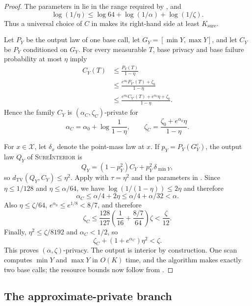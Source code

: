 \documentclass[11pt]{article}
\begin{document}
\begin{proof}
The parameters in  lie in the range required by
, and
\[
 \log(1/\eta)
 \le\log64+\log(1/\alpha)+\log(1/\zeta).
\]
Thus a universal choice of $C$ in  makes its
right-hand side at least $K_{\mathrm{sure}}$.

Let $P_Y$ be the output law of one base call, let
$G_Y=[\min Y,\max Y]$, and let $C_Y$ be $P_Y$ conditioned on $G_Y$.  For
every measurable $T$, base privacy and base failure probability at most
$\eta$ imply
\[
 \begin{aligned}
 C_Y(T)
 &\le\frac{P_Y(T)}{1-\eta}\\
 &\le\frac{e^{\alpha_0}P_{Y'}(T)+\zeta_0}{1-\eta}\\
 &\le\frac{e^{\alpha_0}C_{Y'}(T)+e^{\alpha_0}\eta+\zeta_0}
          {1-\eta}.
 \end{aligned}
\]
Hence the family $C_Y$ is $(\alpha_C,\zeta_C)$-private for
\begin{equation}
 \alpha_C=\alpha_0+\log\frac1{1-\eta},
 \qquad
 \zeta_C=\frac{\zeta_0+e^{\alpha_0}\eta}{1-\eta}.
 \label{eq:conditioned-privacy}
\end{equation}

For $x\in\mathcal X$, let $\delta_x$ denote the point-mass law at $x$.
If $p_Y=P_Y(G_Y^c)$, the output law $Q_Y$ of \textsc{SureInterior} is
\[
 Q_Y=(1-p_Y^2)C_Y+p_Y^2\,\delta_{\min Y},
\]
so $d_{\mathrm{TV}}(Q_Y,C_Y)\le\eta^2$.  Apply  with
$\tau=\eta^2$ and the parameters in
.  Since $\eta\le1/128$ and
$\eta\le\alpha/64$, we have
$\log(1/(1-\eta))\le2\eta$ and therefore
\[
 \alpha_C\le\alpha/4+2\eta
 \le\alpha/4+\alpha/32<\alpha.
\]
Also $\eta\le\zeta/64$, $e^{\alpha_0}\le e^{1/8}<8/7$, and therefore
\[
 \zeta_C
 \le\frac{128}{127}\left(\frac1{16}+\frac{8/7}{64}\right)\zeta
 <\frac\zeta{12}.
\]
Finally, $\eta^2\le\zeta/8192$ and $\alpha_C<1/2$, so
\[
 \zeta_C+(1+e^{\alpha_C})\eta^2<\zeta.
\]
This proves $(\alpha,\zeta)$-privacy.  The output is interior by
construction.  One scan computes $\min Y$ and $\max Y$ in $O(K)$ time, and
the algorithm makes exactly two base calls; the resource bounds now follow
from .
\end{proof}

\subsection{The approximate-private branch}
\end{document}
